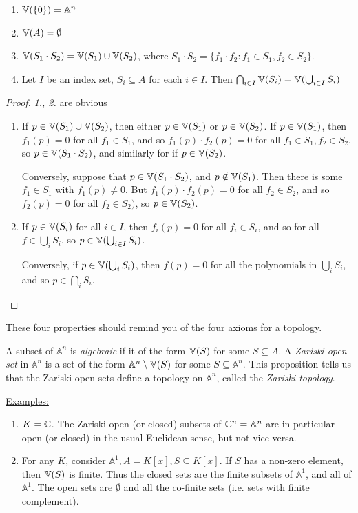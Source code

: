 \documentclass[10pt,a4paper,rgb]{article}
\begin{document}
\begin{proposition}
\item
\begin{enumerate}
\item $\mathbb{V}(\{0\}) = \mathbb{A}^n$
\item $\mathbb{V}(A) = \emptyset$
\item $\mathbb{V}(S_1\cdot S_2) = \mathbb{V}(S_1) \cup \mathbb{V}(S_2)$, where $S_1\cdot S_2 = \{f_1\cdot f_2 : f_1 \in S_1, f_2 \in S_2\}$.
\item Let $I$ be an index set, $S_i \subseteq A$ for each $i \in I$. Then $\bigcap_{i \in I} \mathbb{V}(S_i) = \mathbb{V}(\bigcup_{i \in I} S_i)$
\end{enumerate}
\end{proposition}
\begin{proof} \textit{1., 2.} are obvious
\begin{enumerate}
\item If $p \in \mathbb{V}(S_1) \cup \mathbb{V}(S_2)$, then either $p \in \mathbb{V}(S_1)$ or $p \in \mathbb{V}(S_2)$. If $p \in \mathbb{V}(S_1)$, then $f_1(p) = 0$ for all $f_1 \in S_1$, and so $f_1(p)\cdot f_2(p) = 0$ for all $f_1 \in S_1, f_2 \in S_2$, so $p \in \mathbb{V}(S_1\cdot S_2)$, and similarly for if $p \in \mathbb{V}(S_2)$.

Conversely, suppose that $p \in \mathbb{V}(S_1\cdot S_2)$, and $p \notin \mathbb{V}(S_1)$. Then there is some $f_1 \in S_1$ with $f_1(p) \neq 0$. But $f_1(p)\cdot f_2(p) = 0$ for all $f_2 \in S_2$, and so $f_2(p) = 0$ for all $f_2 \in S_2)$, so $p \in \mathbb{V}(S_2)$.

\item If $p \in \mathbb{V}(S_i)$ for all $i \in I$, then $f_i(p) = 0$ for all $f_i \in S_i$, and so for all $f \in \bigcup_{i} S_i$, so $p \in \mathbb{V}(\bigcup_{i \in I}S_i)$.

Conversely, if $p \in \mathbb{V}(\bigcup_i S_i)$, then $f(p) = 0$ for all the polynomials in $\bigcup_i S_i$, and so $p \in \bigcap_i S_i$.
\end{enumerate}
\end{proof}
These four properties should remind you of the four axioms for a topology.

A subset of $\mathbb{A}^n$ is \emph{algebraic} if it of the form $\mathbb{V}(S)$ for some $S\subseteq A$. A \emph{Zariski open set} in $\mathbb{A}^n$ is a set of the form $\mathbb{A}^n \setminus \mathbb{V}(S)$ for some $S \subseteq \mathbb{A}^n$. This proposition tells us that the Zariski open sets define a topology on $\mathbb{A}^n$, called the \emph{Zariski topology}.

\underline{Examples:}
\begin{enumerate}
\item $K = \mathbb{C}$. The Zariski open (or closed) subsets of $\mathbb{C}^n = \mathbb{A}^n$ are in particular open (or closed) in the usual Euclidean sense, but not vice versa.
\item For any $K$, consider $\mathbb{A}^1, A = K[x], S \subseteq K[x]$. If $S$ has a non-zero element, then $\mathbb{V}(S)$ is finite. Thus the closed sets are the finite subsets of $\mathbb{A}^1$, and all of $\mathbb{A}^1$. The open sets are $\emptyset$ and all the co-finite sets (i.e. sets with finite complement).
\end{enumerate}
\end{document}
